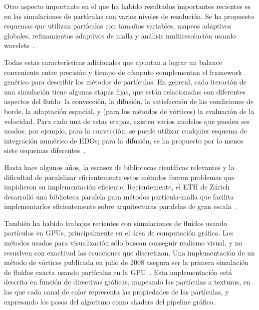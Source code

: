 \documentclass[11pt,spanish]{article}
\newcommand{\vel}{\mathbf{u}}
\newcommand{\vort}{\mathbf{\omega}}
\begin{document}
Otro aspecto importante en el que ha habido resultados importantes recientes es
en las simulaciones de partículas con varios niveles de resolución.
Se ha propuesto esquemas que utilizan
partículas con tamaños variables,
mapeos adaptivos globales,
refinamientos adaptivos de malla
y análisis multiresolución usando wavelets~\cite{multiresolution}.

Todas estas características adicionales que apuntan a lograr un balance
conveniente entre precisión y tiempo de cómputo complementan el framework 
genérico para describir los métodos de partículas.  En general, cada iteración
de una simulación tiene algunas etapas fijas, que están relacionadas con
diferentes aspectos del fluído: la convección, la difusión, la satisfacción de
las condiciones de borde, la adaptación espacial, y (para los métodos de vórtices)
la evaluación de la velocidad.  Para cada una de estas etapas, existen varios
modelos que pueden ser usados:  por ejemplo, para la convección, se puede
utilizar cualquier esquema de integración numérico de EDOs;  para la difusión, 
se ha propuesto por lo menos siete esquemas diferentes~\cite[\S1.2]{barba}.

Hasta hace algunos años, la escasez de bibliotecas científicas relevantes y la
dificultad de paralelizar eficientemente estos métodos fueron problemas que
impidieron su implementación eficiente.  Recientemente, el ETH de Zúrich desarrolló una
biblioteca paralela para métodos partícula-malla que facilita implementarlos
eficientemente sobre arquitecturas paralelas de gran escala~\cite{ppm}.

También ha habido trabajos recientes con simulaciones de fluídos usando partículas
en GPUs, principalmente en el área de computación gráfica.  Los métodos usados
para visualización sólo buscan conseguir realismo visual, y no resuelven con
exactitud las ecuaciones que discretizan.  Una implementación de un método de
vórtices publicada en julio de 2008 asegura ser la primera simulación de fluídos
exacta usando partículas en la GPU~\cite{vortex-gpu}.  Esta implementación está
descrita en función de directivas gráficas, mapeando las partículas a texturas,
en las que cada canal de color representa las propiedades de las partículas, y
expresando los pasos del algoritmo como shaders del pipeline gráfico.

\end{document}
